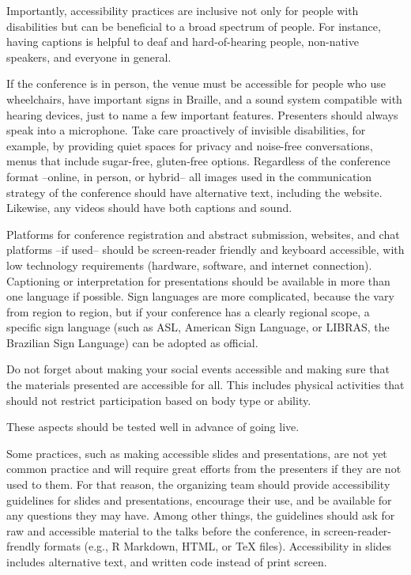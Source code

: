 \documentclass[10pt,letterpaper]{article}
\begin{document}
Importantly, accessibility practices are inclusive not only for people with disabilities but can be beneficial to a broad spectrum of people. For instance, having captions is helpful to deaf and hard-of-hearing people, non-native speakers, and everyone in general. 

If the conference is in person, the venue must be accessible for people who use wheelchairs, have important signs in Braille, and a sound system compatible with hearing devices, just to name a few important features. Presenters should always speak into a microphone. Take care proactively of invisible disabilities, for example, by providing quiet spaces for privacy and noise-free conversations, menus that include sugar-free, gluten-free options. 
Regardless of the conference format --online, in person, or hybrid-- all images used in the communication strategy of the conference should have alternative text, including the website. Likewise, any videos should have both captions and sound.

Platforms for conference registration and abstract submission, websites, and chat platforms --if used-- should be screen-reader friendly and keyboard accessible, with low technology requirements (hardware, software, and internet connection). 
Captioning or interpretation for presentations should be available in more than one language if possible. Sign languages are more complicated, because the vary from region to region, but if your conference has a clearly regional scope, a specific sign language (such as ASL, American Sign Language, or LIBRAS, the Brazilian Sign Language) can be adopted as official.

Do not forget about making your social events accessible and making sure that the materials presented are accessible for all. This includes physical activities that should not restrict participation based on body type or ability.

These aspects should be tested well in advance of going live.  

Some practices, such as making accessible slides and presentations, are not yet common practice and will require great efforts from the presenters if they are not used to them. 
For that reason, the organizing team should provide accessibility guidelines for slides and presentations, encourage their use, and be available for any questions they may have. Among other things, the guidelines should ask for raw and accessible material to the talks before the conference, in screen-reader-frendly formats (e.g., R Markdown, HTML, or \TeX{} files). Accessibility in slides includes alternative text, and written code instead of print screen. 
\end{document}
